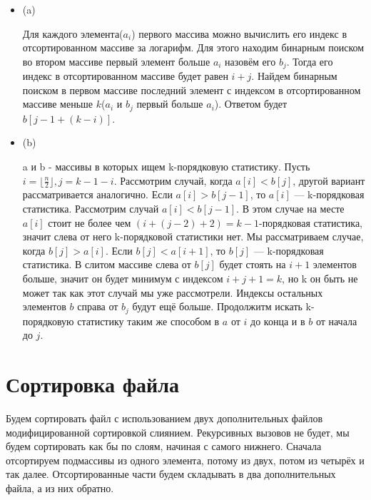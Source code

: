 \documentclass{article}
\begin{document}
\begin{itemize}

    \item (a)

        Для каждого элемента($a_i$) первого массива можно вычислить его индекс
        в отсортированном массиве за логарифм. Для этого находим бинарным
        поиском во втором массиве первый элемент больше $a_i$ назовём его
        $b_j$. Тогда его индекс в отсортированном массиве будет равен $i+j$.
        Найдем бинарным поиском в первом массиве последний элемент с индексом в
        отсортированном массиве меньше $k$($a_i$ и $b_j$ первый больше $a_i$).
        Ответом будет $b[j-1+(k-i)]$.

    \item (b)

        a и b - массивы в которых ищем k-порядковую статистику. Пусть $i =
        \lfloor \frac{n}{2} \rfloor, j = k - 1 - i$. Рассмотрим случай, когда
        $a[i] < b[j]$, другой вариант рассматривается аналогично. Если $a[i] >
        b[j - 1]$, то $a[i]$ --- k-порядковая статистика. Рассмотрим случай
        $a[i] < b[j - 1]$. В этом случае на месте $a[i]$ стоит не более чем
        $(i+(j-2)+2) = k-1$-порядковая статистика, значит слева от него
        k-порядковой статистики нет. Мы рассматриваем случае, когда $b[j] >
        a[i]$. Если $b[j] < a[i + 1]$, то $b[j]$ --- k-порядковая статистика. В
        слитом массиве слева от $b[j]$ будет стоять на $i+1$ элементов больше,
        значит он будет минимум с индексом $i+j+1=k$, но k он быть не может так
        как этот случай мы уже рассмотрели. Индексы остальных элементов $b$
        справа от $b_j$ будут ещё больше. Продолжитм искать k-порядковую
        статистику таким же способом в $a$ от $i$ до конца и в $b$ от начала до
        $j$.

\end{itemize}

\pagebreak

\section{Сортировка файла}

Будем сортировать файл с использованием двух дополнительных файлов
модифицированной сортировкой слиянием. Рекурсивных вызовов не будет, мы будем
сортировать как бы по слоям, начиная с самого нижнего. Сначала отсортируем
подмассивы из одного элемента, потому из двух, потом из четырёх и так далее.
Отсортированные части будем складывать в два дополнительных файла, а из
них обратно.
\end{document}
